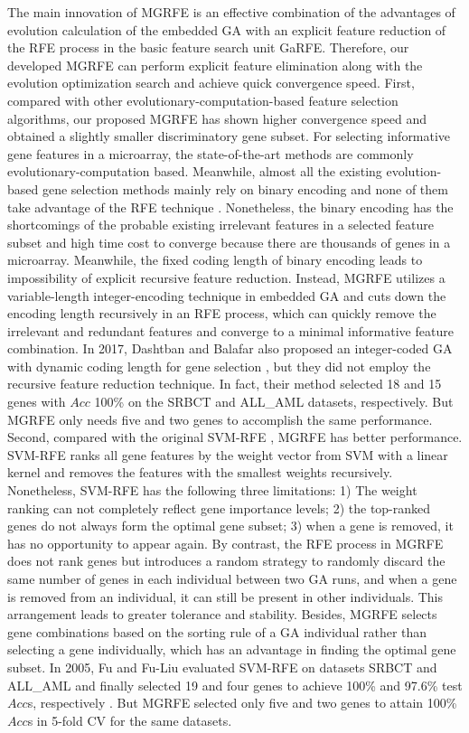 \documentclass[10pt,journal,compsoc]{IEEEtran}
\begin{document}
	The main innovation of MGRFE is an effective combination of the advantages of evolution calculation of the embedded GA with an explicit feature reduction of the RFE process in the basic feature search unit GaRFE. Therefore, our developed MGRFE can perform explicit feature elimination along with the evolution optimization search and achieve quick convergence speed.
	First, compared with other evolutionary-computation-based feature selection algorithms, our proposed MGRFE has shown higher convergence speed and obtained a slightly smaller discriminatory gene subset. For selecting informative gene features in a microarray, the state-of-the-art methods are commonly evolutionary-computation based. Meanwhile, almost all the existing evolution-based gene selection methods mainly rely on binary encoding and none of them take advantage of the RFE technique \cite{RN435,P33,RN437,W15,P32,RN438,RN416}. Nonetheless, the binary encoding has the shortcomings of the probable existing irrelevant features in a selected feature subset and high time cost to converge because there are thousands of genes in a microarray. Meanwhile, the fixed coding length of binary encoding leads to impossibility of explicit recursive feature reduction. Instead, MGRFE utilizes a variable-length integer-encoding technique in embedded GA and cuts down the encoding length recursively in an RFE process, which can quickly remove the irrelevant and redundant features and converge to a minimal informative feature combination. In 2017, Dashtban and Balafar also proposed an integer-coded GA with dynamic coding length for gene selection \cite{P33}, but they did not employ the recursive feature reduction technique. In fact, their method selected 18 and 15 genes with $Acc$ 100\% on the SRBCT and ALL\_AML datasets, respectively. But MGRFE only needs five and two genes to accomplish the same performance. 
	Second, compared with the original SVM-RFE \cite{P1}, MGRFE has better performance. SVM-RFE ranks all gene features by the weight vector from SVM with a linear kernel and removes the features with the smallest weights recursively. Nonetheless, SVM-RFE has the following three limitations: 1) The weight ranking can not completely reflect gene importance levels; 2) the top-ranked genes do not always form the optimal gene subset; 3) when a gene is removed, it has no opportunity to appear again. By contrast, the RFE process in MGRFE does not rank genes but introduces a random strategy to randomly discard the same number of genes in each individual between two GA runs, and when a gene is removed from an individual, it can still be present in other individuals. This arrangement leads to greater tolerance and stability. Besides, MGRFE selects gene combinations based on the sorting rule of a GA individual rather than selecting a gene individually, which has an advantage in finding the optimal gene subset. In 2005, Fu and Fu-Liu evaluated SVM-RFE on datasets SRBCT and ALL\_AML and finally selected 19 and four genes to achieve 100\% and 97.6\% test $Acc$s, respectively \cite{P10}. But MGRFE selected only five and two genes to attain 100\% $Acc$s in 5-fold CV for the same datasets.
\end{document}
